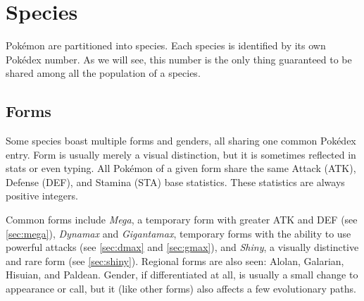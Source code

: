 \chapter{Species}
\label{chap:species}
Pokémon are partitioned into species.
Each species is identified by its own Pokédex number.
As we will see, this number is the only thing guaranteed to be shared
 among all the population of a species.

\section{Forms}
\label{chap:forms}
Some species boast multiple forms and genders, all sharing one common Pokédex entry.
Form is usually merely a visual distinction, but it is sometimes reflected
 in stats or even typing.
All Pokémon of a given form share the same Attack (ATK), Defense (DEF), and
 Stamina (STA) base statistics.
These statistics are always positive integers.

Common forms include \textit{Mega}, a temporary form with greater ATK and DEF (see \autoref{sec:mega}),
  \textit{Dynamax} and \textit{Gigantamax}, temporary forms with the ability to use
  powerful attacks (see \autoref{sec:dmax} and \autoref{sec:gmax}),
  and \textit{Shiny}, a visually distinctive and rare form (see \autoref{sec:shiny}).
Regional forms are also seen: Alolan, Galarian, Hisuian, and Paldean.
Gender, if differentiated at all, is usually a small change to
 appearance or call, but it (like other forms) also affects a few evolutionary
 paths.


